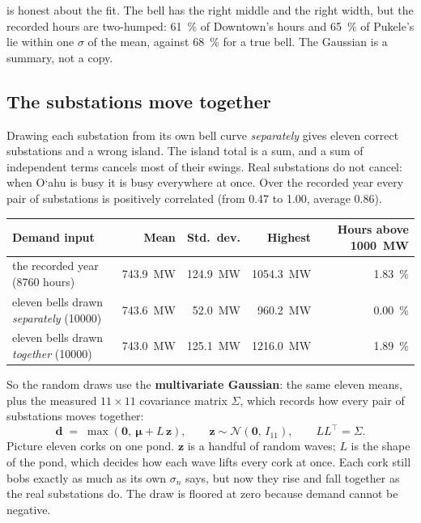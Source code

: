 \documentclass[11pt,a4paper]{article}
\newcommand{\okina}{\textquoteleft}
\newcommand{\Oahu}{O\okina ahu}
\begin{document}
 is honest about the fit. The bell has the right middle and the right
width, but the recorded hours are two-humped: \SI{61}{\percent} of Downtown's hours and
\SI{65}{\percent} of Pukele's lie within one $\sigma$ of the mean, against
\SI{68}{\percent} for a true bell. The Gaussian is a summary, not a copy.

\subsection{The substations move together}

Drawing each substation from its own bell curve \emph{separately} gives eleven correct
substations and a wrong island. The island total is a sum, and a sum of independent
terms cancels most of their swings. Real substations do not cancel: when \Oahu{} is busy
it is busy everywhere at once. Over the recorded year every pair of substations is
positively correlated (from \num{0.47} to \num{1.00}, average \num{0.86}).

\begin{center}
\small
\begin{tabular}{@{}lrrrr@{}}
\toprule
\textbf{Demand input} & \textbf{Mean} & \textbf{Std.\ dev.} & \textbf{Highest} &
  \textbf{Hours above \SI{1000}{MW}} \\
\midrule
the recorded year (\num{8760} hours)            & \SI{743.9}{MW} & \SI{124.9}{MW} & \SI{1054.3}{MW} & \SI{1.83}{\percent} \\
eleven bells drawn \emph{separately} (\num{10000}) & \SI{743.6}{MW} & \SI{52.0}{MW}  & \SI{960.2}{MW}  & \SI{0.00}{\percent} \\
eleven bells drawn \emph{together} (\num{10000})   & \SI{743.0}{MW} & \SI{125.1}{MW} & \SI{1216.0}{MW} & \SI{1.89}{\percent} \\
\bottomrule
\end{tabular}
\end{center}

So the random draws use the \textbf{multivariate Gaussian}: the same eleven means,
plus the measured $11\times 11$ covariance matrix $\Sigma$, which records how every
pair of substations moves together:
\[
  \mathbf{d} \;=\; \max\!\left(\mathbf{0},\ \boldsymbol{\mu} + L\,\mathbf{z}\right),
  \qquad \mathbf{z} \sim \mathcal{N}(\mathbf{0},\, I_{11}),
  \qquad L L^{\top} = \Sigma .
\]
Picture eleven corks on one pond. $\mathbf{z}$ is a handful of random waves; $L$ is
the shape of the pond, which decides how each wave lifts every cork at once. Each cork
still bobs exactly as much as its own $\sigma_n$ says, but now they rise and fall
together as the real substations do. The draw is floored at zero because demand cannot
be negative.
\end{document}
